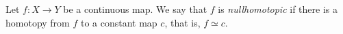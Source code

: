 \documentclass[12pt]{article}
\begin{document}
Let $f:X\to Y$ be a continuous map. We say that $f$ is \emph{nullhomotopic} if there is a homotopy from $f$ to a constant map $c$, that is, $f\simeq c$.
\end{document}

